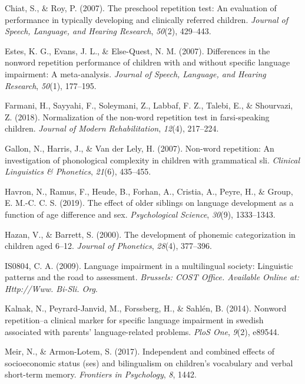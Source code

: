 \documentclass[english,,man,floatsintext]{apa6}
\begin{document}
\leavevmode\hypertarget{ref-chiat2007preschool}{}%
Chiat, S., \& Roy, P. (2007). The preschool repetition test: An evaluation of performance in typically developing and clinically referred children. \emph{Journal of Speech, Language, and Hearing Research}, \emph{50}(2), 429--443.

\leavevmode\hypertarget{ref-estes2007differences}{}%
Estes, K. G., Evans, J. L., \& Else-Quest, N. M. (2007). Differences in the nonword repetition performance of children with and without specific language impairment: A meta-analysis. \emph{Journal of Speech, Language, and Hearing Research}, \emph{50}(1), 177--195.

\leavevmode\hypertarget{ref-farmani2018normalization}{}%
Farmani, H., Sayyahi, F., Soleymani, Z., Labbaf, F. Z., Talebi, E., \& Shourvazi, Z. (2018). Normalization of the non-word repetition test in farsi-speaking children. \emph{Journal of Modern Rehabilitation}, \emph{12}(4), 217--224.

\leavevmode\hypertarget{ref-gallon2007non}{}%
Gallon, N., Harris, J., \& Van der Lely, H. (2007). Non-word repetition: An investigation of phonological complexity in children with grammatical sli. \emph{Clinical Linguistics \& Phonetics}, \emph{21}(6), 435--455.

\leavevmode\hypertarget{ref-havron2019effect}{}%
Havron, N., Ramus, F., Heude, B., Forhan, A., Cristia, A., Peyre, H., \& Group, E. M.-C. C. S. (2019). The effect of older siblings on language development as a function of age difference and sex. \emph{Psychological Science}, \emph{30}(9), 1333--1343.

\leavevmode\hypertarget{ref-hazan2000development}{}%
Hazan, V., \& Barrett, S. (2000). The development of phonemic categorization in children aged 6--12. \emph{Journal of Phonetics}, \emph{28}(4), 377--396.

\leavevmode\hypertarget{ref-is08042009language}{}%
IS0804, C. A. (2009). Language impairment in a multilingual society: Linguistic patterns and the road to assessment. \emph{Brussels: COST Office. Available Online at: Http://Www. Bi-Sli. Org}.

\leavevmode\hypertarget{ref-kalnak2014nonword}{}%
Kalnak, N., Peyrard-Janvid, M., Forssberg, H., \& Sahlén, B. (2014). Nonword repetition--a clinical marker for specific language impairment in swedish associated with parents' language-related problems. \emph{PloS One}, \emph{9}(2), e89544.

\leavevmode\hypertarget{ref-meir2017independent}{}%
Meir, N., \& Armon-Lotem, S. (2017). Independent and combined effects of socioeconomic status (ses) and bilingualism on children's vocabulary and verbal short-term memory. \emph{Frontiers in Psychology}, \emph{8}, 1442.
\end{document}
